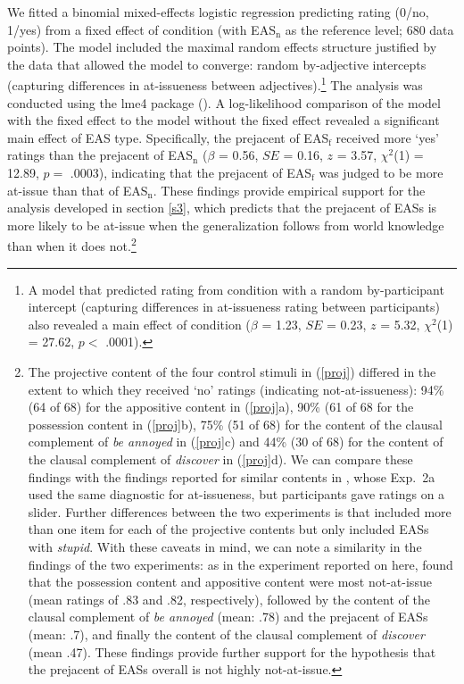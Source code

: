 \documentclass[11pt,fleqn]{article}
\newcommand{\6}{\mbox{$[\hspace*{-.6mm}[$}}
\newcommand{\9}{\mbox{$]\hspace*{-.6mm}]$}}
\begin{document}
We fitted a binomial mixed-effects logistic regression predicting rating (0/no, 1/yes) from a fixed effect of condition (with EAS$_{\mbox{n}}$ as the reference level; 680 data points). The model included the maximal random effects structure justified by the data that allowed the model to converge: random by-adjective intercepts (capturing differences in at-issueness between adjectives).\footnote{A model that predicted rating from condition with a random by-participant intercept (capturing differences in at-issueness rating between participants) also revealed a main effect of condition ($\beta$ = 1.23, $SE$ = 0.23, $z$ = 5.32, $\chi^2$(1) = 27.62, $p <$ .0001).} The analysis was conducted using the lme4 package (\citealt{bates-etal2015}). A log-likelihood comparison of the model with the fixed effect to the model without the fixed effect revealed a significant main effect of EAS type. Specifically, the prejacent of EAS$_{\mbox{f}}$ received more `yes' ratings than the prejacent of EAS$_{\mbox{n}}$ ($\beta$ = 0.56, $SE$ = 0.16, $z$ = 3.57, $\chi^2$(1) = 12.89, $p =$ .0003), indicating that the prejacent of EAS$_{\mbox{f}}$ was judged to be more at-issue than that of EAS$_{\mbox{n}}$. These findings provide empirical support for the analysis developed in section \ref{s3}, which predicts that the prejacent of EASs is more likely to be at-issue when the generalization follows from world knowledge than when it does not.\footnote{The projective content of the four control stimuli in (\ref{proj}) differed in the extent to which they received `no' ratings (indicating not-at-issueness): 94\% (64 of 68) for the appositive content in (\ref{proj}a), 90\% (61 of 68 for the possession content in (\ref{proj}b), 75\% (51 of 68) for the content of the clausal complement of {\em be annoyed} in (\ref{proj}c) and 44\% (30 of 68) for the content of the clausal complement of {\em discover} in (\ref{proj}d). We can compare these findings with the findings reported for similar contents in \citealt{tbd-variability}, whose Exp.~2a used the same diagnostic for at-issueness, but participants gave ratings on a slider. Further differences between the two experiments is that \citealt{tbd-variability} included more than one item for each of the projective contents but only included EASs with {\em stupid}. With these caveats in mind, we can note a similarity in the findings of the two experiments: as in the experiment reported on here, \citet{tbd-variability} found that the possession content and appositive content were most not-at-issue (mean ratings of .83 and .82, respectively), followed by the content of the clausal complement of {\em be annoyed} (mean: .78) and the prejacent of EASs (mean: .7), and finally the content of the clausal complement of {\em discover} (mean .47). These findings provide further support for the hypothesis that the prejacent of EASs overall is not highly not-at-issue.}
\end{document}
